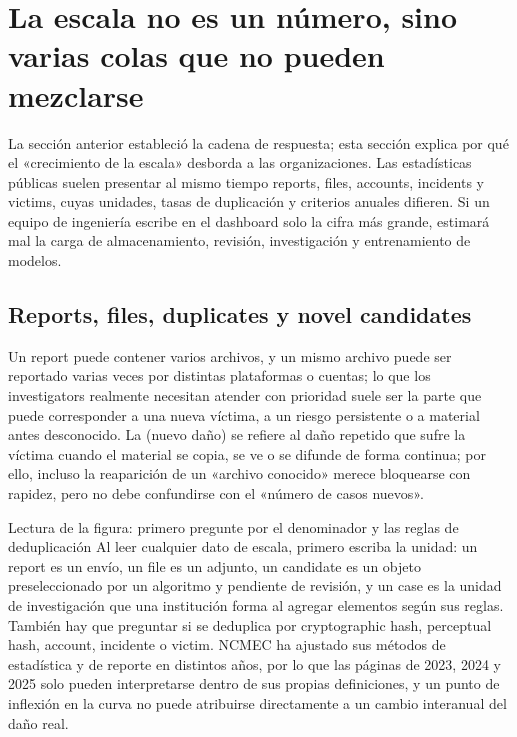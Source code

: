 \section{La escala no es un número, sino varias colas que no pueden mezclarse}

La sección anterior estableció la cadena de respuesta; esta sección explica por qué el «crecimiento de la escala» desborda a las organizaciones. Las estadísticas públicas suelen presentar al mismo tiempo reports, files, accounts, incidents y victims, cuyas unidades, tasas de duplicación y criterios anuales difieren. Si un equipo de ingeniería escribe en el dashboard solo la cifra más grande, estimará mal la carga de almacenamiento, revisión, investigación y entrenamiento de modelos.

\subsection{Reports, files, duplicates y novel candidates}

Un report puede contener varios archivos, y un mismo archivo puede ser reportado varias veces por distintas plataformas o cuentas; lo que los investigators realmente necesitan atender con prioridad suele ser la parte que puede corresponder a una nueva víctima, a un riesgo persistente o a material antes desconocido. La  (nuevo daño) se refiere al daño repetido que sufre la víctima cuando el material se copia, se ve o se difunde de forma continua; por ello, incluso la reaparición de un «archivo conocido» merece bloquearse con rapidez, pero no debe confundirse con el «número de casos nuevos».


\begin{knowledgebox}{Lectura de la figura: primero pregunte por el denominador y las reglas de deduplicación}
Al leer cualquier dato de escala, primero escriba la unidad: un report es un envío, un file es un adjunto, un candidate es un objeto preseleccionado por un algoritmo y pendiente de revisión, y un case es la unidad de investigación que una institución forma al agregar elementos según sus reglas. También hay que preguntar si se deduplica por cryptographic hash, perceptual hash, account, incidente o victim. NCMEC ha ajustado sus métodos de estadística y de reporte en distintos años, por lo que las páginas de 2023, 2024 y 2025 solo pueden interpretarse dentro de sus propias definiciones, y un punto de inflexión en la curva no puede atribuirse directamente a un cambio interanual del daño real.
\end{knowledgebox}


